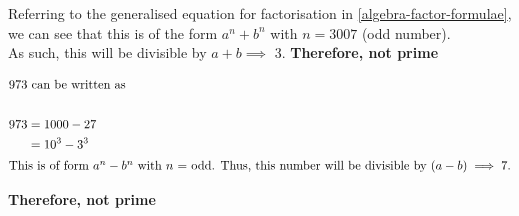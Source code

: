 Referring to the generalised equation for factorisation in \ref{algebra-factor-formulae}, we can see that this is of the form $a^n + b^n$ with $n = 3007$ (odd number). \\

As such, this will be divisible by $a+b \implies$ 3. \textbf{Therefore, not prime }

\begin{align*}
    \shortintertext{973 can be written as} \\
    973 &= 1000 - 27 \\
    &= 10^3 - 3^3 \\
    \shortintertext{This is of form $a^n - b^n$ with $n$ = odd. Thus, this number will be divisible by $(a-b) \implies 7$.}
\end{align*}

\textbf{Therefore, not prime}
  


